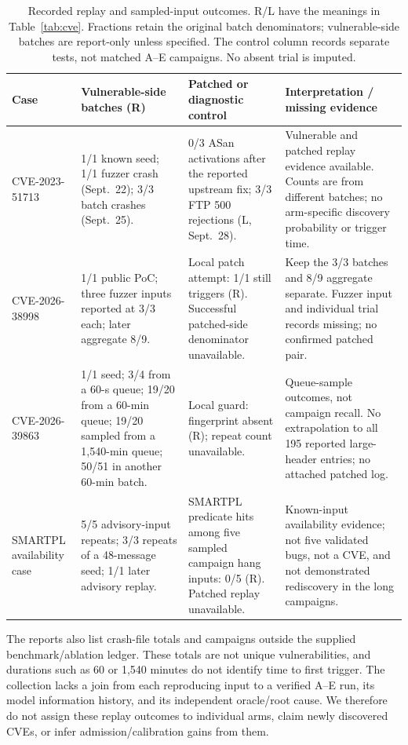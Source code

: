 \documentclass[final,5p,times,number]{elsarticle}
\begin{document}
\begin{table}[!tbp]
\centering\small
\caption{Recorded replay and sampled-input outcomes. R/L have the meanings in Table~\ref{tab:cve}. Fractions retain the original batch denominators; vulnerable-side batches are report-only unless specified. The control column records separate tests, not matched A--E campaigns. No absent trial is imputed.}
\label{tab:cveresults}
\begin{tabularx}{\textwidth}{@{}>{\raggedright\arraybackslash}p{} Y Y Y@{}}
\toprule
Case & Vulnerable-side batches (R) & Patched or diagnostic control & Interpretation / missing evidence \\
\midrule
\mbox{CVE-2023-51713} & 1/1 known seed; 1/1 fuzzer crash (Sept.~22); 3/3 batch crashes (Sept.~25). & 0/3 ASan activations after the reported upstream fix; 3/3 FTP 500 rejections (L, Sept.~28). & Vulnerable and patched replay evidence available. Counts are from different batches; no arm-specific discovery probability or trigger time. \\
\addlinespace[3pt]
\mbox{CVE-2026-38998} & 1/1 public PoC; three fuzzer inputs reported at 3/3 each; later aggregate 8/9. & Local patch attempt: 1/1 still triggers (R). Successful patched-side denominator unavailable. & Keep the 3/3 batches and 8/9 aggregate separate. Fuzzer input and individual trial records missing; no confirmed patched pair. \\
\addlinespace[3pt]
\mbox{CVE-2026-39863} & 1/1 seed; 3/4 from a 60-s queue; 19/20 from a 60-min queue; 19/20 sampled from a 1,540-min queue; 50/51 in another 60-min batch. & Local guard: fingerprint absent (R); repeat count unavailable. & Queue-sample outcomes, not campaign recall. No extrapolation to all 195 reported large-header entries; no attached patched log. \\
\addlinespace[3pt]
SMARTPL availability case & 5/5 advisory-input repeats; 3/3 repeats of a 48-message seed; 1/1 later advisory replay. & SMARTPL predicate hits among five sampled campaign hang inputs: 0/5 (R). Patched replay unavailable. & Known-input availability evidence; not five validated bugs, not a CVE, and not demonstrated rediscovery in the long campaigns. \\
\bottomrule
\end{tabularx}
\end{table}

The reports also list crash-file totals and campaigns outside the supplied benchmark/ablation ledger. These totals are not unique vulnerabilities, and durations such as 60 or 1,540 minutes do not identify time to first trigger. The collection lacks a join from each reproducing input to a verified A--E run, its model information history, and its independent oracle/root cause. We therefore do not assign these replay outcomes to individual arms, claim newly discovered CVEs, or infer admission/calibration gains from them.
\end{document}
